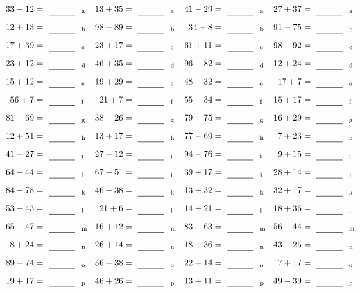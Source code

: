\documentclass
[
  draft    = true,
  fontsize = 11pt,
  parskip  = half-
]
{scrartcl}
\begin{document}
\clearpage
\begin{align*}
    \pline{33-12}&=\rline{a}
  & \pline{13+35}&=\rline{a}
  & \pline{41-29}&=\rline{a}
  & \pline{27+37}&=\rline{a} \\[1ex]
    \pline{12+13}&=\rline{b}
  & \pline{98-89}&=\rline{b}
  & \pline{34+8}&=\rline{b}
  & \pline{91-75}&=\rline{b} \\[1ex]
    \pline{17+39}&=\rline{c}
  & \pline{23+17}&=\rline{c}
  & \pline{61+11}&=\rline{c}
  & \pline{98-92}&=\rline{c} \\[1ex]
    \pline{23+12}&=\rline{d}
  & \pline{46+35}&=\rline{d}
  & \pline{96-82}&=\rline{d}
  & \pline{12+24}&=\rline{d} \\[1ex]
    \pline{15+12}&=\rline{e}
  & \pline{19+29}&=\rline{e}
  & \pline{48-32}&=\rline{e}
  & \pline{17+7}&=\rline{e} \\[1ex]
    \pline{56+7}&=\rline{f}
  & \pline{21+7}&=\rline{f}
  & \pline{55-34}&=\rline{f}
  & \pline{15+17}&=\rline{f} \\[1ex]
    \pline{81-69}&=\rline{g}
  & \pline{38-26}&=\rline{g}
  & \pline{79-75}&=\rline{g}
  & \pline{16+29}&=\rline{g} \\[1ex]
    \pline{12+51}&=\rline{h}
  & \pline{13+17}&=\rline{h}
  & \pline{77-69}&=\rline{h}
  & \pline{7+23}&=\rline{h} \\[1ex]
    \pline{41-27}&=\rline{i}
  & \pline{27-12}&=\rline{i}
  & \pline{94-76}&=\rline{i}
  & \pline{9+15}&=\rline{i} \\[1ex]
    \pline{64-44}&=\rline{j}
  & \pline{67-51}&=\rline{j}
  & \pline{39+17}&=\rline{j}
  & \pline{28+14}&=\rline{j} \\[1ex]
    \pline{84-78}&=\rline{k}
  & \pline{46-38}&=\rline{k}
  & \pline{13+32}&=\rline{k}
  & \pline{32+17}&=\rline{k} \\[1ex]
    \pline{53-43}&=\rline{l}
  & \pline{21+6}&=\rline{l}
  & \pline{14+21}&=\rline{l}
  & \pline{18+36}&=\rline{l} \\[1ex]
    \pline{65-47}&=\rline{m}
  & \pline{16+12}&=\rline{m}
  & \pline{83-63}&=\rline{m}
  & \pline{56-44}&=\rline{m} \\[1ex]
    \pline{8+24}&=\rline{n}
  & \pline{26+14}&=\rline{n}
  & \pline{18+36}&=\rline{n}
  & \pline{43-25}&=\rline{n} \\[1ex]
    \pline{89-74}&=\rline{o}
  & \pline{56-38}&=\rline{o}
  & \pline{22+14}&=\rline{o}
  & \pline{7+17}&=\rline{o} \\[1ex]
    \pline{19+17}&=\rline{p}
  & \pline{46+26}&=\rline{p}
  & \pline{13+11}&=\rline{p}
  & \pline{49-39}&=\rline{p}
\end{align*}
\end{document}
